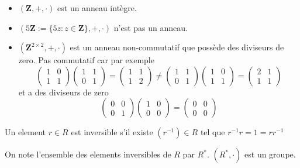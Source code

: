 \begin{example}
\begin{itemize}
\item $(\mathbf{Z},+,\cdot)$ est un anneau intègre.
\item $(5\mathbf{Z}:=\{ 5z:z\in \mathbf{Z} \},+,\cdot)$ n'est pas un anneau.
\item $(\mathbf{Z}^{2\times2},+,\cdot)$ est un anneau non-commutatif que possède des diviseurs de zero. Pas commutatif car par exemple
$$
\begin{pmatrix}
1 & 0 \\
1 & 1
\end{pmatrix}\begin{pmatrix}
1 & 1 \\
0 & 1
\end{pmatrix}=\begin{pmatrix}
1 & 1 \\
1 & 2
\end{pmatrix}\neq \begin{pmatrix}
1 & 1 \\
0 & 1
\end{pmatrix}\begin{pmatrix}
1 & 0 \\
1 & 1
\end{pmatrix}=\begin{pmatrix}
2 & 1 \\
1 & 1
\end{pmatrix}
$$
et a des diviseurs de zero
$$
\begin{pmatrix}
0 & 0 \\
0 & 1
\end{pmatrix}\begin{pmatrix}
1 & 0  \\
0 & 0
\end{pmatrix}=\begin{pmatrix}
0 & 0 \\
0 & 0
\end{pmatrix}
$$
\end{itemize}
\end{example}
\begin{definition}
Un element $r\in R$ est inversible s'il existe $(r^{-1})\in R$ tel que $r^{-1}r=1=rr^{-1}$
\end{definition}
\begin{definition}
On note l'ensemble des elements inversibles de $R$ par $R^{*}$. $(R^{*},\cdot)$ est un groupe.
\end{definition}


